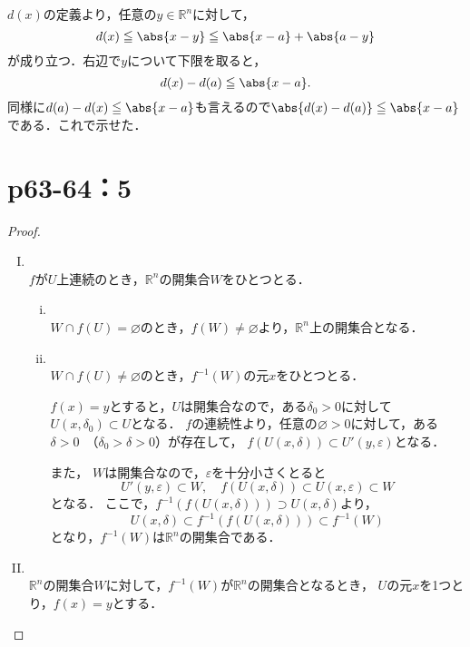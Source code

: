 \documentclass[a4paper,10pt,fleqn]{ltjsarticle}
\begin{document}
  \begin{leftbar}
    $d(x)$の定義より，任意の$y \in \mathbb{R} ^n$に対して，
    \[
      d(x) \leq \abs{x-y} \leq \abs{x-a} + \abs{a-y}
    \]
    が成り立つ．右辺で$y$について下限を取ると，
    \[
      d(x) - d(a) \leq \abs{x-a}.
    \]
    同様に$d(a) - d(x) \leq \abs{x-a}$も言えるので$\abs{d(x) - d(a)} \leq \abs{x-a}$である．これで示せた．
  \end{leftbar}

    \newpage 
    \section*{p63-64：5}
    \begin{leftbar}
      \begin{proof} \mbox{　}  
        \begin{enumerate}[(I)]
        \item \mbox{} \\
        $f$が$U$上連続のとき，$\mathbb{R}^n$の開集合$W$をひとつとる．
        \begin{enumerate}[(i)]
          \item \mbox{} \\
          $ W \cap f(U) = \varnothing$のとき，$f(W) \ne \varnothing$より，$\mathbb{R}^n$上の開集合となる．
          \item \mbox{} \\
          $ W \cap f(U) \ne \varnothing$のとき，$f^{-1} (W)$の元$x$をひとつとる．
          
          $ f(x)=y$とすると，$U$は開集合なので，ある$\delta_0 >0$に対して$U(x,\delta_0) \subset U$となる．
          $f$の連続性より，任意の$\varnothing >0$に対して，ある$\delta >0$~（$\delta_0 >\delta >0$）が存在して，
          $f(U(x,\delta)) \subset U' (y,\varepsilon)$となる．
    
          また， $W$は開集合なので，$\varepsilon$を十分小さくとると
          \[
          U'(y,\varepsilon) \subset W,\quad f(U(x,\delta)) \subset U (x,\varepsilon) \subset W
          \]
          となる．
          ここで，$f^{-1} (f(U(x,\delta))) \supset U(x,\delta)$より，
          \[
          U(x,\delta) \subset f^{-1} (f(U(x,\delta))) \subset f^{-1} (W)
          \]
          となり，$f^{-1} (W)$は$\mathbb{R}^n$の開集合である．
        \end{enumerate}
        \item \mbox{} \\
        $ \mathbb{R}^n$の開集合$W$に対して，$f^{-1} (W)$が$\mathbb{R}^n$の開集合となるとき，
        $U$の元$x$を1つとり，$f(x)=y$とする．
    

\end{enumerate}
\end{proof}
\end{leftbar}
\end{document}
